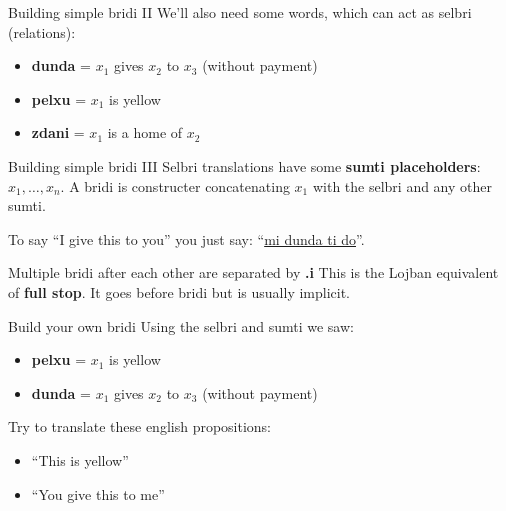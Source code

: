 \begin{frame}{Building simple bridi II}
    We'll also need some words, which can act as selbri (relations):
    \begin{itemize}
        \item \textbf{dunda} = $x_1$ gives $x_2$ to $x_3$ (without payment)
        \item \textbf{pelxu} = $x_1$ is yellow
        \item \textbf{zdani} = $x_1$ is a home of $x_2$
    \end{itemize}
\end{frame}

\begin{frame}{Building simple bridi III}
    Selbri translations have some \textbf{sumti placeholders}: \(x_1, \ldots, x_n\). A bridi is constructer concatenating $x_1$ with the selbri and any other sumti.

    To say ``I give this to you'' you just say: ``\underline{mi dunda ti do}''.

    Multiple bridi after each other are separated by \textbf{.i} This is the Lojban equivalent of \textbf{full stop}. It goes before bridi but is usually implicit.
\end{frame}

\begin{frame}{Build your own bridi}
    Using the selbri and sumti we saw:
    \begin{itemize}
        \item \textbf{pelxu} = $x_1$ is yellow
        \item \textbf{dunda} = $x_1$ gives $x_2$ to $x_3$ (without payment)
    \end{itemize}

    Try to translate these english propositions:
    \begin{itemize}
        \item<2-> ``This is yellow''
        \item<3-> ``You give this to me''
    \end{itemize}
\end{frame}
